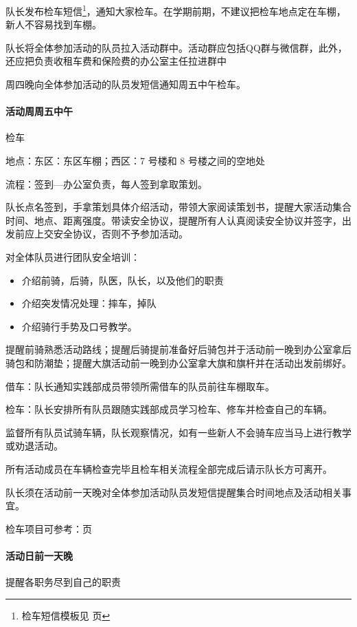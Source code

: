 \documentclass{ctexbook}
\begin{document}
队长发布检车短信\footnote{检车短信模板见 \pageref{subsec:检车通知} 页}，通知大家检车。在学期前期，不建议把检车地点定在车棚，新人不容易找到车棚。

队长将全体参加活动的队员拉入活动群中。活动群应包括QQ群与微信群，此外，还应把负责收租车费和保险费的办公室主任拉进群中

周四晚向全体参加活动的队员发短信通知周五中午检车。

\paragraph{活动周周五中午}

检车

地点：东区：东区车棚；西区：7 号楼和 8 号楼之间的空地处

流程：签到—办公室负责，每人签到拿取策划。

队长点名签到，手拿策划具体介绍活动，带领大家阅读策划书，提醒大家活动集合时间、地点、距离强度。带读安全协议，提醒所有人认真阅读安全协议并签字，出发前应上交安全协议，否则不予参加活动。

对全体队员进行团队安全培训：
\begin{itemize}
    \item 介绍前骑，后骑，队医，队长，以及他们的职责
    \item 介绍突发情况处理：摔车，掉队
    \item 介绍骑行手势及口号教学。
\end{itemize}

提醒前骑熟悉活动路线；提醒后骑提前准备好后骑包并于活动前一晚到办公室拿后骑包和防潮垫；提醒大旗活动前一晚到办公室拿大旗和旗杆并在活动出发前绑好。

借车：队长通知实践部成员带领所需借车的队员前往车棚取车。

检车：队长安排所有队员跟随实践部成员学习检车、修车并检查自己的车辆。

监督所有队员试骑车辆，队长观察情况，如有一些新人不会骑车应当马上进行教学或劝退活动。

所有活动成员在车辆检查完毕且检车相关流程全部完成后请示队长方可离开。

队长须在活动前一天晚对全体参加活动队员发短信提醒集合时间地点及活动相关事宜。

检车项目可参考：\pageref{sec:检车}页
\paragraph{活动日前一天晚}

提醒各职务尽到自己的职责
\end{document}
